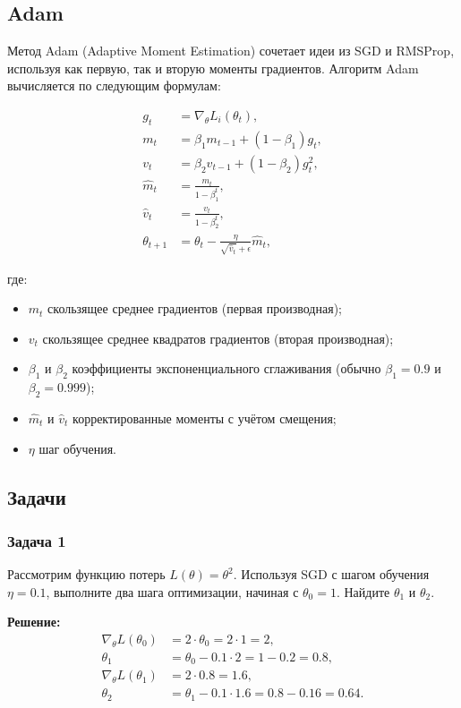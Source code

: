\subsection{Adam}

Метод Adam (Adaptive Moment Estimation) сочетает идеи из SGD и RMSProp, используя как первую, так и вторую моменты градиентов. Алгоритм Adam вычисляется по следующим формулам:

\begin{align}
    g_t &= \nabla_\theta L_i(\theta_t), \\
    m_t &= \beta_1 m_{t-1} + (1 - \beta_1) g_t, \\
    v_t &= \beta_2 v_{t-1} + (1 - \beta_2) g_t^2, \\
    \hat{m}_t &= \frac{m_t}{1 - \beta_1^t}, \\
    \hat{v}_t &= \frac{v_t}{1 - \beta_2^t}, \\
    \theta_{t+1} &= \theta_t - \frac{\eta}{\sqrt{\hat{v}_t} + \epsilon} \hat{m}_t,
\end{align}

где:
\begin{itemize}
    \item $m_t$ \textendash{} скользящее среднее градиентов (первая производная);
    \item $v_t$ \textendash{} скользящее среднее квадратов градиентов (вторая производная);
    \item $\beta_1$ и $\beta_2$ \textendash{} коэффициенты экспоненциального сглаживания (обычно $\beta_1 = 0.9$ и $\beta_2 = 0.999$);
    \item $\hat{m}_t$ и $\hat{v}_t$ \textendash{} корректированные моменты с учётом смещения;
    \item $\eta$ \textendash{} шаг обучения.
\end{itemize}

\subsection{Задачи}

\subsubsection*{Задача 1}
Рассмотрим функцию потерь $L(\theta) = \theta^2$. Используя SGD с шагом обучения $\eta = 0.1$, выполните два шага оптимизации, начиная с $\theta_0 = 1$. Найдите $\theta_1$ и $\theta_2$.

\textbf{Решение:}
\begin{align*}
    \nabla_\theta L(\theta_0) &= 2 \cdot \theta_0 = 2 \cdot 1 = 2, \\
    \theta_1 &= \theta_0 - 0.1 \cdot 2 = 1 - 0.2 = 0.8, \\
    \nabla_\theta L(\theta_1) &= 2 \cdot 0.8 = 1.6, \\
    \theta_2 &= \theta_1 - 0.1 \cdot 1.6 = 0.8 - 0.16 = 0.64.
\end{align*}


